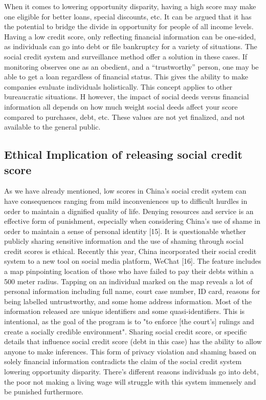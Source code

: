 \documentclass[letterpaper, 10 pt, conference]{ieeeconf}  %
\begin{document}
When it comes to lowering opportunity disparity,  having a high score may make one eligible for better loans, special discounts, etc. It can be argued that it has the potential to bridge the divide in opportunity for people of all income levels. Having a low credit score, only reflecting financial information can be one-sided, as individuals can go into debt or file bankruptcy for a variety of situations. The social credit system and surveillance method offer a solution in these cases. If monitoring observes one as an obedient, and a “trustworthy” person, one may be able to get a loan regardless of financial status. This gives the ability to make companies evaluate individuals holistically. This concept applies to other bureaucratic situations. H	however, the impact of social deeds versus financial information all depends on how much weight social deeds affect your score compared to purchases, debt, etc. These values are not yet finalized, and not available to the general public.

\subsection{Ethical Implication of releasing social credit score}

As we have already mentioned, low scores in China’s social credit system can have consequences ranging from mild inconveniences up to difficult hurdles in order to maintain a dignified quality of life. Denying resources and service is an effective form of punishment, especially when considering China’s use of shame in order to maintain a sense of personal identity [15]. It is questionable whether publicly sharing sensitive information and the use of shaming through social credit scores is ethical. Recently this year, China incorporated their social credit system to a new tool on social media platform, WeChat [16]. The feature includes a map pinpointing location of those who have failed to pay their debts within a 500 meter radius. Tapping on an individual marked on the map reveals a lot of personal information including full name, court case number, ID card, reasons for being labelled untrustworthy, and some home address information. Most of the information released are unique identifiers and some quasi-identifiers. This is intentional, as the goal of the program is to "to enforce [the court’s] rulings and create a socially credible environment". Sharing social credit score, or specific details that influence social credit score (debt in this case) has the ability to allow anyone to make inferences. This form of privacy violation and shaming based on solely financial information contradicts the claim of the social credit system lowering opportunity disparity.  There’s different reasons individuals go into debt, the poor not making a living wage will struggle with this system immensely and be punished furthermore. 
\end{document}
